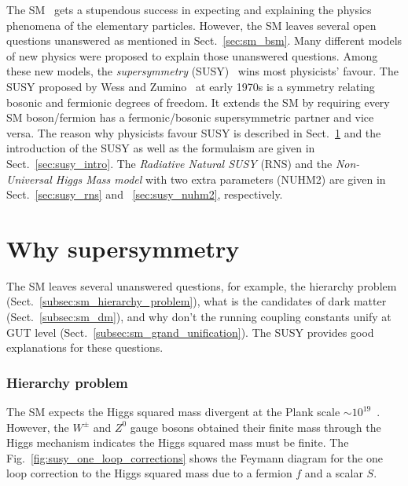 The SM~\cite{Salam:1968rm, Glashow:1961tr, Weinberg:1967tq, Herrero:1998eq, Cottingham:2007zz} gets a stupendous success in expecting and explaining the physics phenomena of the elementary particles.
However, the SM leaves several open questions unanswered as mentioned in Sect.~\ref{sec:sm_bsm}.
Many different models of new physics were proposed to explain those unanswered questions.
Among these new models, the \textit{supersymmetry} (SUSY)~\cite{Wess:1974tw, Lykken:1996xt, Drees:1996ca, Martin:1997ns, Bilal:2001nv, Argyres:2001eva, Peskin:2008nw, Aitchison:2005cf, Shadmi:2017qdk} wins most physicists' favour.
The SUSY proposed by Wess and Zumino~\cite{Wess:1974tw} at early 1970s is a symmetry relating bosonic and fermionic degrees of freedom.
It extends the SM by requiring every SM boson/fermion has a fermonic/bosonic supersymmetric partner and vice versa.
The reason why physicists favour SUSY is described in Sect.~\ref{sec:susy_why_susy} and the introduction of the SUSY as well as the formulaism are given in Sect.~\ref{sec:susy_intro}.
The \textit{Radiative Natural SUSY} (RNS) and the \textit{Non-Universal Higgs Mass model} with two extra parameters (NUHM2) are given in Sect.~\ref{sec:susy_rns} and ~\ref{sec:susy_nuhm2}, respectively.


\section{Why supersymmetry}
\label{sec:susy_why_susy}
The SM leaves several unanswered questions, for example, the hierarchy problem (Sect.~\ref{subsec:sm_hierarchy_problem}), what is the candidates of dark matter (Sect.~\ref{subsec:sm_dm}), and why don't the running coupling constants unify at GUT level (Sect.~\ref{subsec:sm_grand_unification}).
The SUSY provides good explanations for these questions.


\subsubsection{Hierarchy problem}
\label{subsubsec:susy_hierarchy_problem}
The SM expects the Higgs squared mass divergent at the Plank scale $\sim 10^{19}$~{\GeV}.
However, the $W^{\pm}$ and $Z^{0}$ gauge bosons obtained their finite mass through the Higgs mechanism indicates the Higgs squared mass must be finite.
The Fig.~\ref{fig:susy_one_loop_corrections} shows the Feymann diagram for the one loop correction to the Higgs squared mass due to a fermion $f$ and a scalar $S$.

